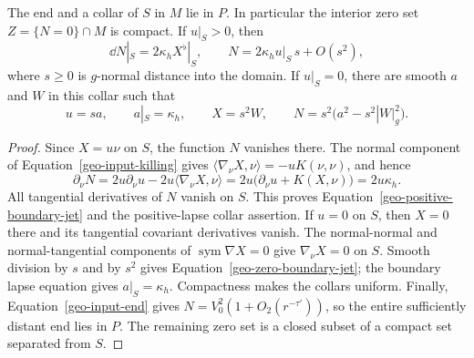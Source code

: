 \begin{lemma}
\label{geo-positive-collars}
The end and a collar of $S$ in $M$ lie in $P$.  In particular the interior
zero set $Z=\{N=0\}\cap M$ is compact.  If $u|_S>0$, then
\begin{equation}
 \dd N|_S=2\kappa_h X^\flat|_S,
 \qquad N=2\kappa_h u|_S\,s+O(s^2),
 \label{geo-positive-boundary-jet}
\end{equation}
where $s\geq0$ is $g$-normal distance into the domain.  If $u|_S=0$, there
are smooth $a$ and $W$ in this collar such that
\begin{equation}
 u=sa,\qquad a|_S=\kappa_h,\qquad X=s^2W,
 \qquad N=s^2\bigl(a^2-s^2|W|_g^2\bigr).
 \label{geo-zero-boundary-jet}
\end{equation}
\end{lemma}
\begin{proof}
Since $X=u\nu$ on $S$, the function $N$ vanishes there.  The normal component
of Equation~\eqref{geo-input-killing} gives
$\langle\nabla_\nu X,\nu\rangle=-uK(\nu,\nu)$, and hence
\[
 \partial_\nu N
 =2u\partial_\nu u-2u\langle\nabla_\nu X,\nu\rangle
 =2u\bigl(\partial_\nu u+K(X,\nu)\bigr)=2u\kappa_h.
\]
All tangential derivatives of $N$ vanish on $S$.  This proves
Equation~\eqref{geo-positive-boundary-jet} and the positive-lapse collar
assertion.  If $u=0$ on $S$, then $X=0$ there and its tangential covariant
derivatives vanish.  The normal-normal and normal-tangential components of
$\operatorname{sym}\nabla X=0$ give $\nabla_\nu X=0$ on $S$.  Smooth division
by $s$ and by $s^2$ gives Equation~\eqref{geo-zero-boundary-jet}; the boundary
lapse equation gives $a|_S=\kappa_h$.  Compactness makes the collars uniform.
Finally, Equation~\eqref{geo-input-end} gives
$N=V_0^2(1+O_2(r^{-\tau'}))$, so the entire sufficiently distant end lies in
$P$.  The remaining zero set is a closed subset of a compact set separated
from $S$.
\end{proof}

